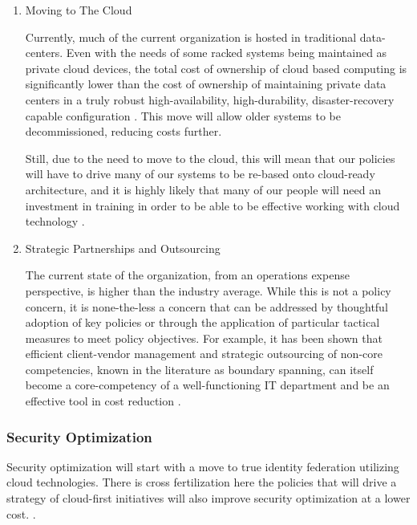 \documentclass[stu]{apa7}
\begin{document}
\begin{enumerate}
\item Moving to The Cloud
\label{sec:org848010f}

Currently, much of the current organization is hosted in traditional data-centers. Even with the needs of some racked systems being maintained as private cloud devices, the total cost of ownership of cloud based computing is significantly lower than the cost of ownership of maintaining private data centers in a truly robust high-availability, high-durability, disaster-recovery capable configuration \citep{chiTotalCostOwnership2021}. This move will allow older systems to be decommissioned, reducing costs further.

Still, due to the need to move to the cloud, this will mean that our policies will have to drive many of our systems to be re-based onto cloud-ready architecture, and it is highly likely that many of our people will need an investment in training in order to be able to be effective working with cloud technology \citep{sayeghCloudTalentDrought,kenellyReasonsMostCompanies2019}.

\item Strategic Partnerships and Outsourcing
\label{sec:org24664af}

The current state of the organization, from an operations expense perspective, is higher than the industry average. While this is not a policy concern, it is none-the-less a concern that can be addressed by thoughtful adoption of key policies or through the application of particular tactical measures to meet policy objectives. For example, it has been shown that efficient client-vendor management and strategic outsourcing of non-core competencies, known in the literature as boundary spanning, can itself become a core-competency of a well-functioning IT department and be an effective tool in cost reduction \citep{chattopadhyayVendorBoundarySpanning2021}.
\end{enumerate}

\subsubsection{Security Optimization}
\label{sec:org671c5dc}

Security optimization will start with a move to true identity federation utilizing cloud technologies. There is cross fertilization here the policies that will drive a strategy of cloud-first initiatives will also improve security optimization at a lower cost.  \cite{linCloudComputingInnovation2012,zhangWeKnewIt2014,awsAWSSecurityBest2016,kennedya.torkuraIntegratingContinuousSecurity2017}.
\end{document}

